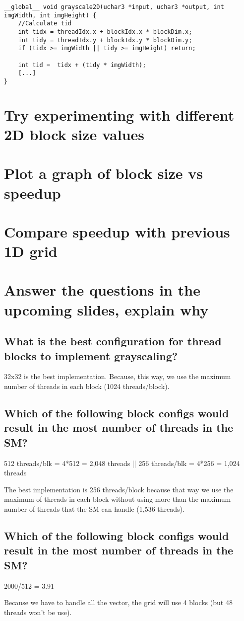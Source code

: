\documentclass[11pt]{article} %
\begin{document}
\lstset{language=C}
\begin{lstlisting}
__global__ void grayscale2D(uchar3 *input, uchar3 *output, int imgWidth, int imgHeight) {
    //Calculate tid
    int tidx = threadIdx.x + blockIdx.x * blockDim.x;
    int tidy = threadIdx.y + blockIdx.y * blockDim.y;
    if (tidx >= imgWidth || tidy >= imgHeight) return;

    int tid =  tidx + (tidy * imgWidth);
    [...]
}
\end{lstlisting}

\section{Try experimenting with different 2D block size values}

\section{Plot a graph of block size vs speedup}

\section{Compare speedup with previous 1D grid}

\section{Answer the questions in the upcoming slides, explain why}

\subsection{What is the best configuration for thread blocks to implement grayscaling?}

32x32 is the best implementation. Because, this way, we use the maximum number of threads in each block (1024 threads/block).

\subsection{Which of the following block configs would result in the most number of threads in the SM?}

512 threads/blk = 4*512 = 2,048 threads || 256 threads/blk = 4*256 = 1,024 threads

The best implementation is 256 threads/block because that way we use the maximum of threads in each block without using more than the maximum number of threads that the SM can handle (1,536 threads).

\subsection{Which of the following block configs would result in the most number of threads in the SM?}

2000/512 = 3.91

Because we have to handle all the vector, the grid will use 4 blocks (but 48 threads won't be use).
\end{document}
